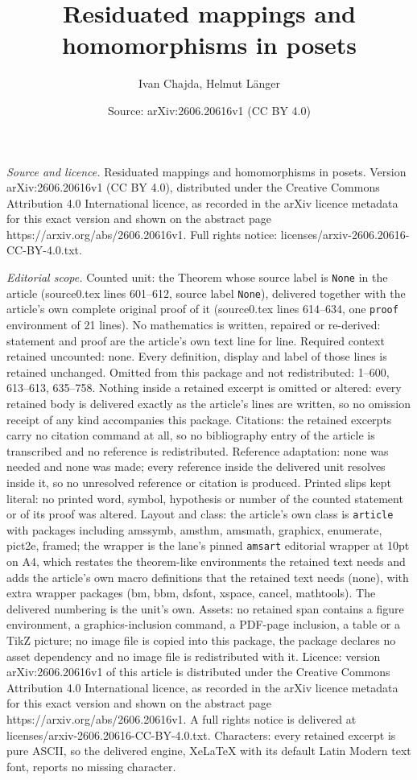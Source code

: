 \documentclass[10pt,a4paper]{amsart}
\title[Residuated mappings and homomorphisms in posets]{Residuated mappings and homomorphisms in posets}
\author{Ivan Chajda, Helmut L\"anger}
\date{Source: arXiv:2606.20616v1 (CC BY 4.0)}
\begin{document}
\maketitle

\noindent\emph{Source and licence.} Residuated mappings and homomorphisms in posets. Version arXiv:2606.20616v1 (CC BY 4.0), distributed under the Creative Commons Attribution 4.0 International licence, as recorded in the arXiv licence metadata for this exact version and shown on the abstract page https://arxiv.org/abs/2606.20616v1. Full rights notice: licenses/arxiv-2606.20616-CC-BY-4.0.txt.\par\smallskip

\noindent\textit{Editorial scope.} Counted unit: the Theorem whose source label is \texttt{None} in the article (source0.tex lines 601--612, source label \texttt{None}), delivered together with the article's own complete original proof of it (source0.tex lines 614--634, one \texttt{proof} environment of 21 lines). No mathematics is written, repaired or re-derived: statement and proof are the article's own text line for line. Required context retained uncounted: none. Every definition, display and label of those lines is retained unchanged. Omitted from this package and not redistributed: 1--600, 613--613, 635--758. Nothing inside a retained excerpt is omitted or altered: every retained body is delivered exactly as the article's lines are written, so no omission receipt of any kind accompanies this package. Citations: the retained excerpts carry no citation command at all, so no bibliography entry of the article is transcribed and no reference is redistributed. Reference adaptation: none was needed and none was made; every reference inside the delivered unit resolves inside it, so no unresolved reference or citation is produced. Printed slips kept literal: no printed word, symbol, hypothesis or number of the counted statement or of its proof was altered. Layout and class: the article's own class is \texttt{article} with packages including amssymb, amsthm, amsmath, graphicx, enumerate, pict2e, framed; the wrapper is the lane's pinned \texttt{amsart} editorial wrapper at 10pt on A4, which restates the theorem-like environments the retained text needs and adds the article's own macro definitions that the retained text needs (none), with extra wrapper packages (bm, bbm, dsfont, xspace, cancel, mathtools). The delivered numbering is the unit's own. Assets: no retained span contains a figure environment, a graphics-inclusion command, a PDF-page inclusion, a table or a TikZ picture; no image file is copied into this package, the package declares no asset dependency and no image file is redistributed with it. Licence: version arXiv:2606.20616v1 of this article is distributed under the Creative Commons Attribution 4.0 International licence, as recorded in the arXiv licence metadata for this exact version and shown on the abstract page https://arxiv.org/abs/2606.20616v1. A full rights notice is delivered at licenses/arxiv-2606.20616-CC-BY-4.0.txt. Characters: every retained excerpt is pure ASCII, so the delivered engine, XeLaTeX with its default Latin Modern text font, reports no missing character.
\end{document}
